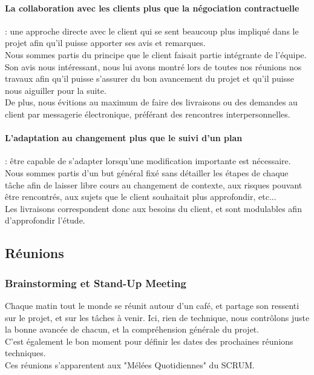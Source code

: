 \paragraph{La collaboration avec les clients plus que la négociation contractuelle} : une approche directe avec le client qui se sent beaucoup plus impliqué dans le projet afin qu'il puisse apporter ses avis et remarques.\\

Nous sommes partis du principe que le client faisait partie intégrante de l'équipe. Son avis nous intéressant, nous lui avons montré lors de toutes nos réunions nos travaux afin qu'il puisse s'assurer du bon avancement du projet et qu'il puisse nous aiguiller pour la suite.\\

De plus, nous évitions au maximum de faire des livraisons ou des demandes au client par messagerie électronique, préférant des rencontres interpersonnelles.


\paragraph{L’adaptation au changement plus que le suivi d’un plan} : être capable de s’adapter lorsqu'une modification importante est nécessaire.\\

Nous sommes partis d'un but général fixé sans détailler les étapes de chaque tâche afin de laisser libre cours au changement de contexte, aux risques pouvant être rencontrés, aux sujets que le client souhaitait plus approfondir, etc...\\
Les livraisons correspondent donc aux besoins du client, et sont modulables afin d'approfondir l'étude.

\subsection{Réunions}

\subsubsection{Brainstorming et Stand-Up Meeting}

Chaque matin tout le monde se réunit autour d'un café, et partage son ressenti sur le projet, et sur les tâches à venir. Ici, rien de technique, nous contrôlons juste la bonne avancée de chacun, et la compréhension générale du projet. \\
C'est également le bon moment pour définir les dates des prochaines réunions techniques.\\
Ces réunions s'apparentent aux "Mélées Quotidiennes" du SCRUM.

